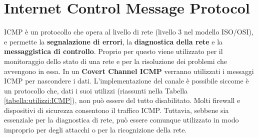 \section{Internet Control Message Protocol}
ICMP \cite{icmp} è un protocollo che opera al livello di rete (livello 3 nel modello ISO/OSI),  
e permette la \textbf{segnalazione di errori}, la \textbf{diagnostica della rete} e la \textbf{messaggistica di controllo}. 
Proprio per questo viene utilizzato per il monitoraggio dello stato di una rete e per la risoluzione dei problemi che avvengono in essa. 
%
\vspace{4ex} \newline 
In un \textbf{Covert Channel ICMP} verranno utilizzati i messaggi ICMP %
per nascondere i dati. 
L'implementazione del canale è possibile siccome è un protocollo che, dati i suoi utilizzi (riassunti nella Tabella \ref{tabella:utilizzi:ICMP}), 
non può essere del tutto disabilitato. 
Molti firewall e dispositivi di sicurezza consentono il traffico ICMP. %
Tuttavia, sebbene sia essenziale per la diagnostica di rete, %
può essere comunque utilizzato in modo improprio per degli attacchi o per la ricognizione della rete. 

